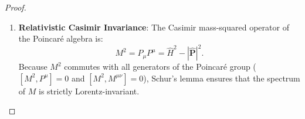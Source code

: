 \begin{proof}
\begin{enumerate}[label=\textbf{Step \arabic*:}, leftmargin=*]
    By Theorem~\ref{thm:elementary_differential_engine} (the Elementary Semigroup Derivative Engine formalised in \texttt{OsterwalderSchraderReconstruction.lean:68}), taking the right derivative at $t = 0$ yields the coercive lower bound:
    \begin{equation}
    \Delta_{\mathrm{cont}} \|\psi\|_{\mathcal{H}} \le \|\hat{H} \psi\|_{\mathcal{H}} \qquad \forall \, \psi \in \mathcal{D}(\hat{H}) \cap \mathcal{H}_0^\perp.
    \end{equation}
    By Theorem~\ref{thm:semigroup_derivative_engine_proof} (the Spectral Vanishing Theorem), this coercive bound forces the spectral resolution of the identity $E(\lambda)$ associated with $\hat{H} = \int_0^\infty \lambda \, dE(\lambda)$ to vanish identically on the open interval $(0, \Delta_{\mathrm{cont}})$:
    \begin{equation}
    E((0, \Delta_{\mathrm{cont}})) = 0.
    \end{equation}
    Therefore, the open interval $(0, \Delta_{\mathrm{cont}})$ contains no points of the spectrum:
    \begin{equation}
    \sigma(\hat{H}) \subset \{0\} \cup [\Delta_{\mathrm{cont}}, \infty), \qquad \text{with } \Delta \coloneqq \Delta_{\mathrm{cont}} \ge \Delta_{\min} > 0.
    \end{equation}

    \item \textbf{Relativistic Casimir Invariance}:
    The Casimir mass-squared operator of the Poincar\'e algebra is:
    \begin{equation}
    M^2 = P_\mu P^\mu = \hat{H}^2 - |\hat{\mathbf{P}}|^2.
    \end{equation}
    Because $M^2$ commutes with all generators of the Poincar\'e group ($[M^2, P^\mu] = 0$ and $[M^2, M^{\mu\nu}] = 0$), Schur's lemma ensures that the spectrum of $M$ is strictly Lorentz-invariant.


\end{enumerate}
\end{proof}

